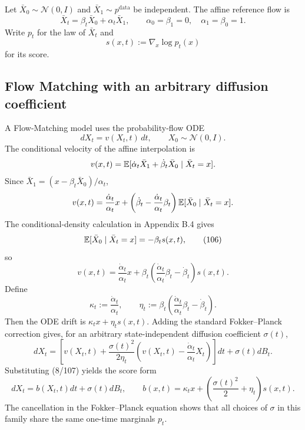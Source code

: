 Let $\bar X_0\sim\mathcal N(0,I)$ and $\bar X_1\sim p^{\mathrm{data}}$ be independent.  The affine reference flow is
\begin{equation*}
 \bar X_t=\beta_t\bar X_0+\alpha_t\bar X_1,
 \qquad
 \alpha_0=\beta_1=0,
 \quad
 \alpha_1=\beta_0=1.
 \tag{2}
\end{equation*}
Write $p_t$ for the law of $\bar X_t$ and
\[
 s(x,t):=\nabla_x\log p_t(x)
\]
for its score.

\subsection{Flow Matching with an arbitrary diffusion coefficient}
A Flow-Matching model uses the probability-flow ODE
\begin{equation*}
 dX_t=v(X_t,t)\,dt,
 \qquad X_0\sim\mathcal N(0,I).
 \tag{3}
\end{equation*}
The conditional velocity of the affine interpolation is
\[
 v(x,t)=\mathbb{E}[\dot\alpha_t\bar X_1+\dot\beta_t\bar X_0\mid \bar X_t=x].
\]
Since $\bar X_1=(x-\beta_t\bar X_0)/\alpha_t$,
\[
 v(x,t)
 =\frac{\dot\alpha_t}{\alpha_t}x
 +\left(\dot\beta_t-\frac{\dot\alpha_t}{\alpha_t}\beta_t\right)
 \mathbb{E}[\bar X_0\mid \bar X_t=x].
\]
The conditional-density calculation in Appendix B.4 gives
\begin{equation*}
 \mathbb{E}[\bar X_0\mid \bar X_t=x]=-\beta_t s(x,t),
 \tag{106}
\end{equation*}
so
\begin{equation*}
 v(x,t)=\frac{\dot\alpha_t}{\alpha_t}x
 +\beta_t\left(\frac{\dot\alpha_t}{\alpha_t}\beta_t-\dot\beta_t\right)s(x,t).
 \tag{8/107}
\end{equation*}
Define
\begin{equation*}
 \kappa_t:=\frac{\dot\alpha_t}{\alpha_t},
 \qquad
 \eta_t:=\beta_t\left(\frac{\dot\alpha_t}{\alpha_t}\beta_t-\dot\beta_t\right).
 \tag{11a}
\end{equation*}
Then the ODE drift is $\kappa_tx+\eta_ts(x,t)$.  Adding the standard Fokker--Planck correction gives, for an arbitrary state-independent diffusion coefficient $\sigma(t)$,
\begin{equation*}
 dX_t=
 \left[
 v(X_t,t)
 +\frac{\sigma(t)^2}{2\eta_t}
 \left(v(X_t,t)-\frac{\dot\alpha_t}{\alpha_t}X_t\right)
 \right]dt+\sigma(t)dB_t.
 \tag{4}
\end{equation*}
Substituting (8/107) yields the score form
\begin{equation*}
 dX_t=b(X_t,t)dt+\sigma(t)dB_t,
 \qquad
 b(x,t)=\kappa_tx+\left(\frac{\sigma(t)^2}{2}+\eta_t\right)s(x,t).
 \tag{10--11}
\end{equation*}
The cancellation in the Fokker--Planck equation shows that all choices of $\sigma$ in this family share the same one-time marginals $p_t$.


